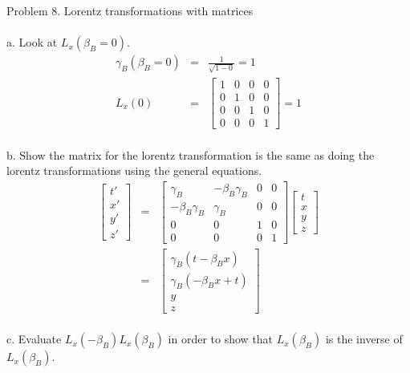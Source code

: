 \documentclass[11pt]{amsart}
\begin{document}
Problem 8. Lorentz transformations with matrices	 \\ \\
a. Look at $L_{x}(\beta_{B}=0)$. \\
\begin{eqnarray*}
\gamma_{B}(\beta_{B}=0) &=& \frac{1}{\sqrt{1-0}} = 1 \\
L_{x}(0) &=& \begin{bmatrix}
	1 & 0 & 0 & 0 \\
	0 & 1 & 0 & 0 \\
	0 & 0 & 1 & 0 \\
	0 & 0 & 0 & 1 
	\end{bmatrix}  =1
\end{eqnarray*} \\
b. Show the matrix for the lorentz transformation is the same as doing the lorentz transformations using the general equations. \\
\begin{eqnarray*} 
\begin{bmatrix}
	t' \\
	x' \\
	y' \\
	z' 
	\end{bmatrix} &=& \begin{bmatrix}
	\gamma_{B} & -\beta_{B}\gamma_{B} & 0 & 0 \\
	-\beta_{B}\gamma_{B} & \gamma_{B} & 0 & 0 \\
	0 & 0 & 1 & 0 \\
	0 & 0 & 0 & 1 
	\end{bmatrix}\begin{bmatrix}
	t \\
	x \\
	y \\
	z 
	\end{bmatrix} \\
&=& \begin{bmatrix}
	\gamma_{B}(t-\beta_{B}x) \\
	\gamma_{B}(-\beta_{B}x+t) \\
	y \\
	z 
	\end{bmatrix}
\end{eqnarray*} \\
c. Evaluate $L_{x}(-\beta_{B})L_{x}(\beta_{B})$ in order to show that $L_{x}(\beta_{B})$ is the inverse of $L_{x}(\beta_{B})$. \\
\end{document}
